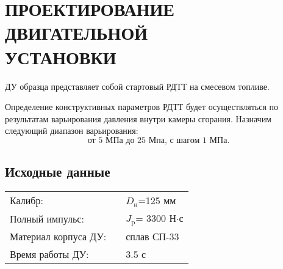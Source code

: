 \chapter{ПРОЕКТИРОВАНИЕ ДВИГАТЕЛЬНОЙ \\ УСТАНОВКИ}
ДУ образца представляет собой стартовый РДТТ на смесевом топливе.

Определение конструктивных параметров РДТТ будет осуществляться по результатам варьирования давления внутри камеры сгорания. Назначим следующий диапазон варьирования:
\[ \text{от 5 МПа до 25 Мпа, с шагом 1 МПа.}
\]

\section{Исходные данные}
\begin{table}[!h]
	\begin{center}
		\begin{tabular}{l l l}
Калибр:				 &  & $D_\text{н}$=125 мм \\ 
Полный импульс:		 &	& $J_\text{p}$= 3300 Н$\cdot$с \\ 
Материал корпуса ДУ: &	& сплав СП-33 \\
Время работы ДУ:	 &	& 3.5 с \\ 
		\end{tabular}
		\label{tab:hellfire_stats}
	\end{center}
\end{table}

